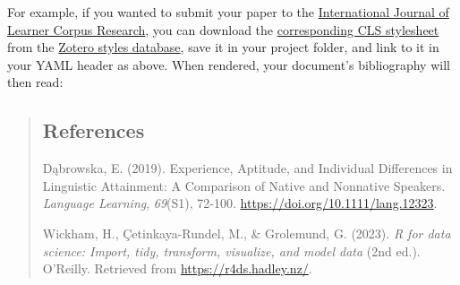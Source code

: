 \documentclass[
  letterpaper,
  DIV=11,
  numbers=noendperiod]{scrreprt}
\begin{document}
For example, if you wanted to submit your paper to the
\href{https://benjamins.com/catalog/ijlcr}{International Journal of
Learner Corpus Research}, you can download the
\href{https://www.zotero.org/styles/international-journal-of-learner-corpus-research}{corresponding
CLS stylesheet} from the \href{https://www.zotero.org/styles}{Zotero
styles database}, save it in your project folder, and link to it in your
YAML header as above. When rendered, your document's bibliography will
then read:

\begin{quote}
\mbox{}%
\subsection*{References}\label{references-1}

Dąbrowska, E. (2019). Experience, Aptitude, and Individual Differences
in Linguistic Attainment: A Comparison of Native and Nonnative Speakers.
\emph{Language Learning}, \emph{69}(S1), 72-100.
\url{https://doi.org/10.1111/lang.12323}.

Wickham, H., Çetinkaya-Rundel, M., \& Grolemund, G. (2023). \emph{R for
data science: Import, tidy, transform, visualize, and model data} (2nd
ed.). O'Reilly. Retrieved from \url{https://r4ds.hadley.nz/}.
\end{quote}
\end{document}
